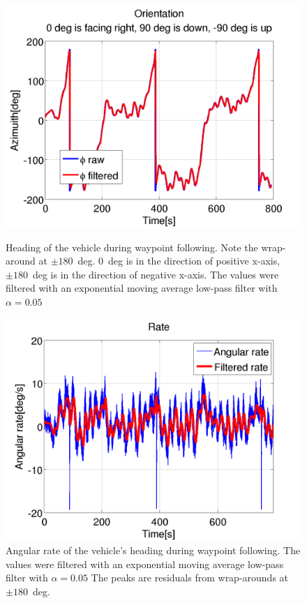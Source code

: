 \begin{figure}
\centering
{}
\includegraphics[width=\textwidth]{Files/Figures/wp_2015-10-29_18-42-34-orientation.png}
\caption[Orientation during waypoint following]{Heading of the vehicle during waypoint following. Note the wrap-around at $\pm180$~deg. 0~deg is in the direction of positive x-axis, $\pm180$~deg is in the direction of negative x-axis. The values were filtered with an exponential moving average low-pass filter with $\alpha=0.05$}
\label{fig:wp_orientation}
\endminipage\hfill
{}
\includegraphics[width=\textwidth]{Files/Figures/wp_2015-10-29_18-42-34-ang_rate.png}
\caption[Angular rate during waypoint following]{Angular rate of the vehicle's heading during waypoint following. The values were filtered with an exponential moving average low-pass filter with $\alpha=0.05$ The peaks are residuals from wrap-arounds at $\pm180$~deg.\newline}
\label{fig:wp_ang_rate}
\endminipage\hfill
\end{figure}


